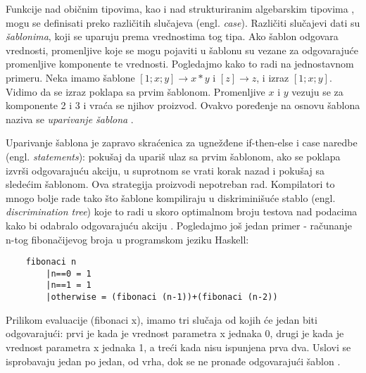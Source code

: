 Funkcije nad običnim tipovima, kao i nad strukturiranim algebarskim tipovima \cite{algebraic-types}, mogu se definisati preko različitih slučajeva (engl. \textit{case}). Različiti slučajevi dati su \textit{šablonima}, koji se uparuju prema vrednostima tog tipa. Ako šablon odgovara vrednosti, promenljive koje se mogu pojaviti u šablonu su vezane za odgovarajuće promenljive komponente te vrednosti. Pogledajmo kako to radi na jednostavnom primeru. Neka imamo šablone $[1; x; y] \longrightarrow x*y$ i $[z] \longrightarrow z$, i izraz $[1; x; y]$. Vidimo da se izraz poklapa sa prvim šablonom. Promenljive $x$ i $y$ vezuju se za komponente 2 i 3 i vraća se njihov proizvod. Ovakvo poređenje na osnovu šablona naziva se \textit{uparivanje šablona} \cite{compiler-design}.

Uparivanje šablona je zapravo skraćenica za ugnežđene if-then-else i case naredbe (engl. \textit{statements}): pokušaj da upariš ulaz sa prvim šablonom, ako se poklapa izvrši odgovarajuću akciju, u suprotnom se vrati korak nazad i pokušaj sa sledećim šablonom. Ova strategija proizvodi nepotreban rad. Kompilatori to mnogo bolje rade tako što šablone kompiliraju u diskriminišuće stablo (engl. \textit{discrimination tree}) koje to radi u skoro optimalnom broju testova nad podacima kako bi odabralo odgovarajuću akciju \cite{compiling-fl}. Pogledajmo još jedan primer - računanje n-tog fibonačijevog broja u programskom jeziku Haskell:
\begin{verbatim}
    fibonaci n
        |n==0 = 1
        |n==1 = 1
        |otherwise = (fibonaci (n-1))+(fibonaci (n-2))
\end{verbatim}

Prilikom evaluacije (fibonaci x), imamo tri slučaja od kojih će jedan biti odgovarajući: prvi je kada je vrednost parametra x jednaka 0, drugi je kada je vrednost parametra x jednaka 1, a treći kada nisu ispunjena prva dva. Uslovi se isprobavaju jedan po jedan, od vrha, dok se ne pronađe odgovarajući šablon \cite{the-implementation-of-functional-programming-languages}. 



